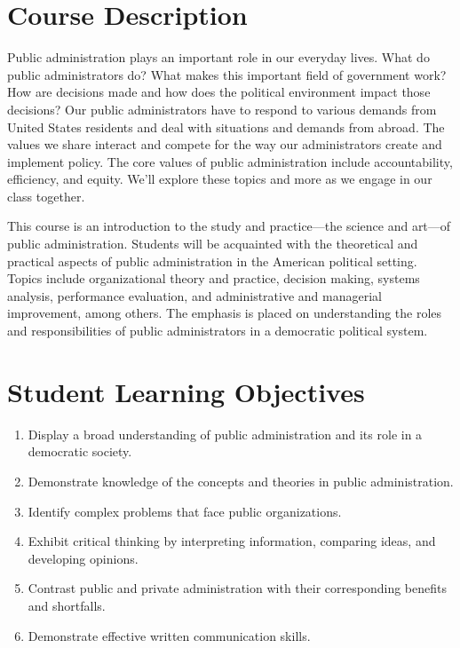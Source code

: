 \documentclass[12pt, letterpaper]{article}
\begin{document}
\section{Course Description}

Public administration plays an important role in our everyday lives. What do public administrators do? What makes this important field of government work? How are decisions made and how does the political environment impact those decisions? Our public administrators have to respond to various demands from United States residents and deal with situations and demands from abroad. The values we share interact and compete for the way our administrators create and implement policy. The core values of public administration include accountability, efficiency, and equity. We'll explore these topics and more as we engage in our class together. 

\vspace*{1em}

\noindent This course is an introduction to the study and practice---the science and art---of public administration. Students will be acquainted with the theoretical and practical aspects of public administration in the American political setting. Topics include organizational theory and practice, decision making, systems analysis, performance evaluation, and administrative and managerial improvement, among others. The emphasis is placed on understanding the roles and responsibilities of public administrators in a democratic political system. 
	

\section{Student Learning Objectives}

\begin{enumerate}
    \item Display a broad understanding of public administration and its role in a democratic society. 

    \item Demonstrate knowledge of the concepts and theories in public administration. 
    
    \item Identify complex problems that face public organizations.

    \item Exhibit critical thinking by interpreting information, comparing ideas, and developing opinions. 
    
    \item Contrast public and private administration with their corresponding benefits and shortfalls. 

    \item Demonstrate effective written communication skills. 

\end{enumerate}
\end{document}
